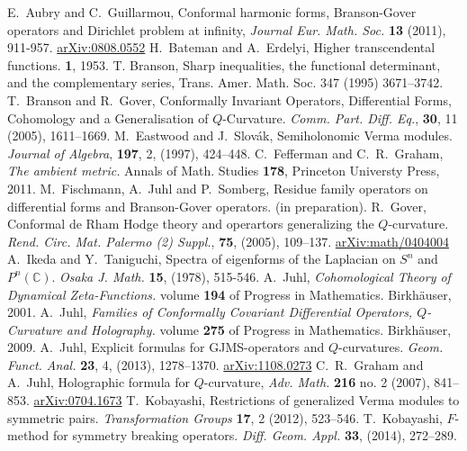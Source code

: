 \documentclass[a4paper,12pt,reqno]{amsart}
\numberwithin{theorem}{subsection}
\numberwithin{equation}{section}
\begin{document}
\begin{thebibliography}{KOSS15}

E.~Aubry and C.~Guillarmou, Conformal harmonic forms, Branson-Gover operators
and Dirichlet problem at infinity, {\em Journal Eur. Math. Soc.} {\bf 13}
(2011), 911-957. \url{arXiv:0808.0552}
H.~Bateman and A.~Erdelyi, Higher transcendental functions. {\bf 1},
1953.
 T. Branson, Sharp inequalities, the functional
determinant, and the complementary series, Trans. Amer. Math. Soc. 347 (1995)
3671--3742.
T.~Branson and R.~Gover, Conformally Invariant Operators,
Differential Forms, Cohomology and a Generalisation of
$Q$-Curvature. {\em Comm. Part. Diff. Eq.}, {\bf 30}, 11 (2005),
1611--1669.
M.~Eastwood and J.~Slov\'ak, Semiholonomic Verma modules. {\em
Journal of Algebra}, {\bf 197}, 2, (1997), 424--448.
C.~Fefferman and C.~R.~Graham, {\em The ambient metric.} Annals of
Math. Studies {\bf 178}, Princeton Universty Press, 2011.
M.~Fischmann, A.~Juhl and P.~Somberg, Residue family operators on differential
forms and Branson-Gover operators. (in preparation).
R.~Gover, Conformal de Rham Hodge theory and operartors generalizing the
$Q$-curvature. {\em Rend. Circ. Mat. Palermo (2) Suppl.}, {\bf 75}, (2005),
109--137. \url{arXiv:math/0404004}
A.~Ikeda and Y.~Taniguchi, Spectra of eigenforms of the Laplacian on
$S^n$ and $P^n({\mathbb{C}})$. {\em Osaka J. Math.} {\bf 15}, (1978), 515-546.
A.~Juhl, {\em Cohomological Theory of Dynamical Zeta-Functions.}
volume {\bf 194} of Progress in Mathematics. Birkh\"auser, 2001.
A.~Juhl, {\em Families of Conformally Covariant Differential
Operators, $Q$-Curvature and Holography.} volume {\bf 275} of
Progress in Mathematics. Birkh\"auser, 2009.
A.~Juhl, Explicit formulas for GJMS-operators and $Q$-curvatures.
{\em Geom. Funct. Anal.} {\bf 23}, 4, (2013), 1278--1370.
\url{arXiv:1108.0273}
C.~R.~Graham and A.~Juhl, Holographic formula for {$Q$}-curvature, {\em Adv.
Math.} {\bf 216} no. 2 (2007), 841--853. \url{arXiv:0704.1673}
T.~Kobayashi, Restrictions of generalized Verma modules to symmetric
pairs. {\em Transformation Groups} {\bf 17}, 2 (2012), 523--546.
T.~Kobayashi, $F$-method for symmetry breaking operators. {\em Diff. Geom.
Appl.} {\bf 33}, (2014), 272--289.

\end{thebibliography}
\end{document}
